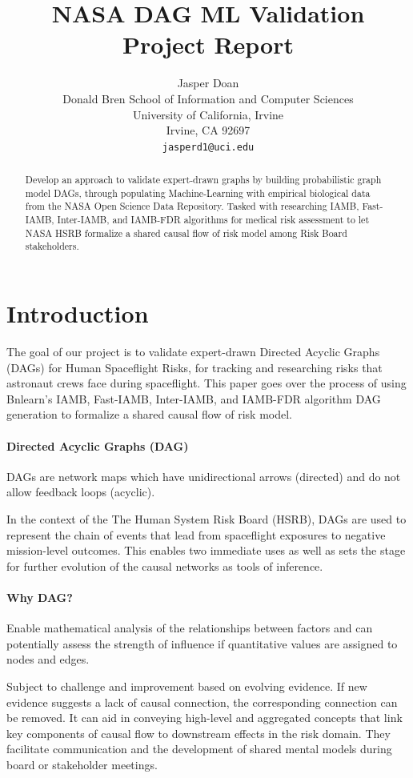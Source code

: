 \documentclass{article}
\title{NASA DAG ML Validation Project Report}
\author{
  Jasper Doan \\
  Donald Bren School of Information and Computer Sciences\\
  University of California, Irvine\\
  Irvine, CA 92697 \\
  \texttt{jasperd1@uci.edu} \\
}
\begin{document}
\maketitle
\begin{abstract}
Develop an approach to validate expert-drawn graphs by building probabilistic graph model DAGs, through populating Machine-Learning with empirical biological data from the NASA Open Science Data Repository. Tasked with researching IAMB, Fast-IAMB, Inter-IAMB, and IAMB-FDR algorithms for medical risk assessment to let NASA HSRB formalize a shared causal flow of risk model among Risk Board stakeholders. 
\end{abstract}




\section{Introduction}
The goal of our project is to validate expert-drawn Directed Acyclic Graphs (DAGs) for Human Spaceflight Risks, for tracking and researching risks that astronaut crews face during spaceflight.
This paper goes over the process of using Bnlearn's IAMB, Fast-IAMB, Inter-IAMB, and IAMB-FDR algorithm DAG generation to formalize a shared causal flow of risk model.

\paragraph{Directed Acyclic Graphs (DAG)}
DAGs are network maps which have unidirectional arrows (directed) and do not allow feedback loops (acyclic). 

In the context of the The Human System Risk Board (HSRB), DAGs are used to represent the chain of events that lead from spaceflight exposures to negative mission-level outcomes. This enables two immediate uses as well as sets the stage for further evolution of the causal networks as tools of inference.

\paragraph{Why DAG?}
Enable mathematical analysis of the relationships between factors and can potentially assess the strength of influence if quantitative values are assigned to nodes and edges.

Subject to challenge and improvement based on evolving evidence. If new evidence suggests a lack of causal connection, the corresponding connection can be removed.
It can aid in conveying high-level and aggregated concepts that link key components of causal flow to downstream effects in the risk domain.
They facilitate communication and the development of shared mental models during board or stakeholder meetings.
\end{document}
